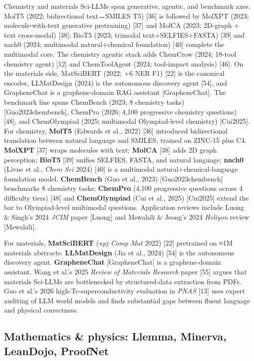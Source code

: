 Chemistry and materials Sci-LLMs span generative, agentic, and benchmark axes. MolT5 (2022; bidirectional text↔SMILES T5) {[}36{]} is followed by MolXPT (2023; molecule-with-text generative pretraining) {[}37{]} and MolCA (2023; 2D-graph + text cross-modal) {[}38{]}; BioT5 (2023; trimodal text+SELFIES+FASTA) {[}39{]} and nach0 (2024; multimodal natural+chemical foundation) {[}40{]} complete the multimodal core. The chemistry agentic stack adds ChemCrow (2024; 18-tool chemistry agent) {[}12{]} and ChemToolAgent (2024; tool-impact analysis) {[}46{]}. On the materials side, MatSciBERT (2022; +6 NER F1) {[}22{]} is the canonical encoder, LLMatDesign (2024) is the autonomous discovery agent {[}54{]}, and GrapheneChat is a graphene-domain RAG assistant {[}GrapheneChat{]}. The benchmark line spans ChemBench (2023; 8 chemistry tasks) {[}Guo2023chembench{]}, ChemPro (2026; 4,100 progressive chemistry questions) {[}48{]}, and ChemOlympiad (2025; multimodal Olympiad-level chemistry) {[}Cui2025{]}. For chemistry, \textbf{MolT5} (Edwards et al., 2022) {[}36{]} introduced bidirectional translation between natural language and SMILES, trained on ZINC-15 plus C4. \textbf{MolXPT} {[}37{]} wraps molecules with text; \textbf{MolCA} {[}38{]} adds 2D graph perception; \textbf{BioT5} {[}39{]} unifies SELFIES, FASTA, and natural language; \textbf{nach0} (Livne et al., \emph{Chem Sci} 2024) {[}40{]} is a multimodal natural+chemical-language foundation model. \textbf{ChemBench} (Guo et al., 2023) {[}Guo2023chembench{]} benchmarks 8 chemistry tasks; \textbf{ChemPro} (4,100 progressive questions across 4 difficulty tiers) {[}48{]} and \textbf{ChemOlympiad} (Cui et al., 2025) {[}Cui2025{]} extend the bar to Olympiad-level multimodal questions. Application reviews include Luong \& Singh's 2024 \emph{JCIM} paper {[}Luong{]} and Mswahili \& Jeong's 2024 \emph{Heliyon} review {[}Mswahili{]}.

For materials, \textbf{MatSciBERT} (\emph{npj Comp Mat} 2022) {[}22{]} pretrained on ≈1M materials abstracts. \textbf{LLMatDesign} (Jia et al., 2024) {[}54{]} is the autonomous discovery agent. \textbf{GrapheneChat} {[}GrapheneChat{]} is a graphene-domain assistant. Wang et al.'s 2025 \emph{Review of Materials Research} paper {[}55{]} argues that materials Sci-LLMs are bottlenecked by structured-data extraction from PDFs. Guo et al.'s 2026 high-Tc-superconductivity evaluation in \emph{PNAS} {[}13{]} uses expert auditing of LLM world models and finds substantial gaps between fluent language and physical correctness.

\subsection{Mathematics \& physics: Llemma, Minerva, LeanDojo, ProofNet}\label{mathematics-physics-llemma-minerva-leandojo-proofnet}


